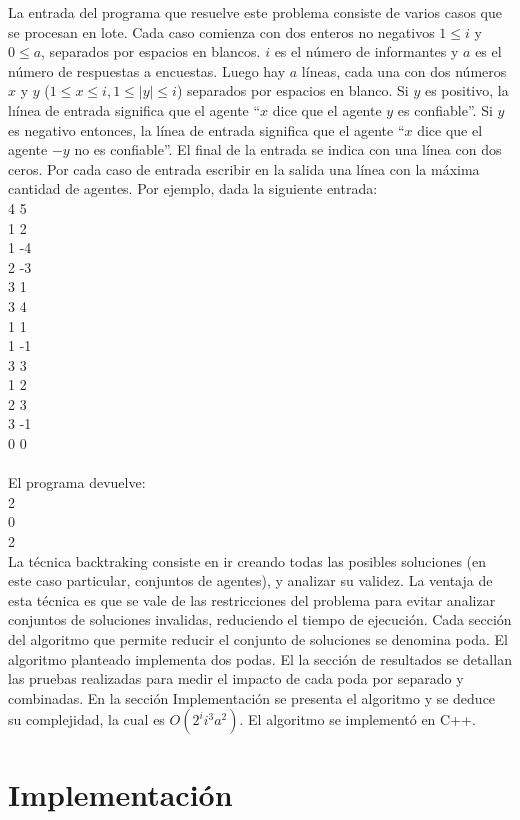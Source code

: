 \documentclass{article}
\begin{document}
La entrada del programa que resuelve este problema consiste de varios casos que se procesan en lote. Cada caso comienza con dos enteros no negativos $1 \leq i$ y $0 \leq a$, separados por espacios en blancos. $i$ es el número de informantes y $a$ es el número de respuestas a encuestas. Luego hay $a$ líneas, cada una con dos números $x$ y $y$ ($1 \leq x \leq i, 1 \leq |y| \leq i$) separados por espacios en blanco. Si $y$ es positivo, la lıínea de entrada significa que el agente “$x$ dice que el agente $y$ es confiable”. Si $y$ es negativo entonces, la línea de entrada significa que el agente “$x$ dice que el agente $-y$ no es confiable”. El final de la entrada se indica con una línea con dos ceros. Por cada caso de entrada escribir en la salida una línea con la máxima cantidad de agentes. Por ejemplo, dada la siguiente entrada: \\
4 5 \\
1 2 \\
1 -4 \\
2 -3 \\
3 1 \\
3 4 \\
1 1 \\
1 -1 \\
3 3 \\
1 2 \\
2 3 \\
3 -1 \\
0 0 \\ \\
El programa devuelve: \\
2 \\
0 \\
2 \\

La técnica backtraking consiste en ir creando todas las posibles soluciones (en este caso particular, conjuntos de agentes), y analizar su validez. La ventaja de esta técnica es que se vale de las restricciones del problema para evitar analizar conjuntos de soluciones invalidas, reduciendo el tiempo de ejecución. Cada sección del algoritmo que permite reducir el conjunto de soluciones se denomina poda. El algoritmo planteado implementa dos podas. El la sección de resultados se detallan las pruebas realizadas para medir el impacto de cada poda por separado y combinadas.
En la sección Implementación se presenta el algoritmo y se deduce su complejidad, la cual es $O(2^i i^3 a^2) $.
 El algoritmo se implementó en C++. 

\section{Implementación}
\end{document}
